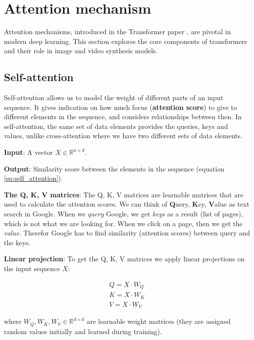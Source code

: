 \section{Attention mechanism}
\label{appendix:attention}

Attention mechanisms, introduced in the Transformer paper \cite{transformer}, are pivotal in modern deep learning. This section explores the core components of transformers and their role in image and video synthesis models.






\subsection{Self-attention}

Self-attention allows us to model the weight of different parts of an input sequence. It gives indication on how much focus (\textbf{attention score}) to give to different elements in the sequence, and considers relationships between then. In self-attention, the same set of data elements provides the queries, keys and values, unlike cross-attention where we have two different sets of data elements.

\textbf{Input}: A vector $X \in \mathbb{R}^{n \times d}$.

\textbf{Output}: Similarity score between the elements in the sequence (equation \ref{eq:self_attention}).

\textbf{The Q, K, V matrices}: The Q, K, V matrices are learnable matrices that are used to calculate the attention scores. We can think of \textbf{Q}uery, \textbf{K}ey, \textbf{V}alue as text search in Google. When we \textit{query} Google, we get \textit{keys} as a result (list of pages), which is not what we are looking for. When we click on a page, then we get the \textit{value}. Therefor Google has to find similarity (attention scores) between query and the keys.

\textbf{Linear projection}: To get the Q, K, V matrices we apply linear projections on the input sequence $X$: 

\begin{align*}
    Q = X\cdot W_Q \\
    K = X\cdot W_K \\
    V = X\cdot W_V
\end{align*}

where $W_Q, W_K, W_V \in \mathbb{R}^{d \times d}$ are learnable weight matrices (they are assigned random values initially and learned during training).



